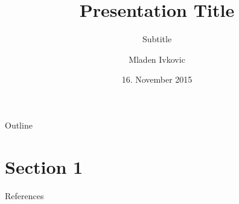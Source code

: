 




\title{Presentation Title}
\subtitle{Subtitle}

\author[M. Ivkovic]{Mladen Ivkovic}
\date[16.11.15]{16. November 2015}












\begin{frame}{}
	\titlepage
\end{frame}


\begin{frame}{Outline}\label{tableofcontents}
   \tableofcontents
\end{frame}

\section{Section 1}
\begin{frame}{}
    
\end{frame}


\begin{frame}{}
    
\end{frame}


\begin{frame}{}
    
\end{frame}


\begin{frame}{}
    
\end{frame}


\begin{frame}{References}
    \cite{AHF}
    
    \parencite{AMR}
    
    \renewcommand*{\bibfont}{\footnotesize}
    \printbibliography[]    
\end{frame}







